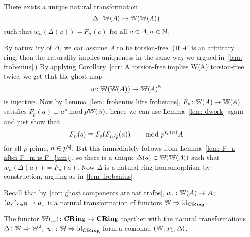 \begin{proposition} \label{prop: existence of diagonal}
    There exists a unique natural transformation
    \[
      \Delta \colon \mathbb{W}(A) \to \mathbb{W}(\mathbb{W}(A))  
    \]
    such that $w_n(\Delta(a))=F_n(a)$ for all $a \in A, n \in \mathbb{N}$.
\end{proposition}
\begin{beweis}
By naturality of $\Delta$, we can assume $A$ to be torsion-free. (If $A'$ is 
an arbitrary ring, then the naturality implies uniqueness in the same way we argued
in~\ref{lem: frobenius}.)
\todo{}
By applying Corollary~\ref{cor: A torsion-free implies W(A) torsion-free}
twice, we get that the ghost map 
\[
    w \colon \mathbb{W}(\mathbb{W}(A)) \to \mathbb{W}(A)^{\mathbb{N}}
\]
is injective. Now by Lemma~\ref{lem: frobenius lifts frobenius}, 
$F_p \colon \mathbb{W}(A) \to \mathbb{W}(A)$ satisfies $F_p(a) \equiv a^p$ mod $p\mathbb{W}(A)$,
hence we can use Lemma~\ref{lem: dwork} again and just show that
\[
  F_n(a)   \equiv F_p(F_{n/p}(a)) \text{\hskip8mm mod }p^{v_p(n)}A
\]
for all $p$ prime, $n \in p\mathbb{N}$. But this immediately follows from 
Lemma~\ref{lem: F_n after F_m is F_{nm}}, so there is a unique $\Delta(a)
\in \mathbb{W}(\mathbb{W}(A))$ such that $w_n(\Delta(a)) = F_n(a)$. Now $\Delta$ is a natural 
ring homomorphism by construction, arguing as in~\ref{lem: frobenius}.
\end{beweis}
Recall that by~\ref{cor: ghost components are nat trafos},
$w_1 \colon \mathbb{W}(A) \to A$; $(a_n)_{n \in \mathbb{N}} \mapsto a_1$
is a natural transformation of functors $\mathbb{W} \Rightarrow \operatorname{id}_{\mathbf{CRing}}$.
\begin{theorem} \label{thm: comonad structure}
    The functor $\mathbb{W}(\_) \colon \mathbf{CRing} \to \mathbf{CRing}$ together with the
    natural transformations $\Delta \colon \mathbb{W} \Rightarrow \mathbb{W}^2,$ $w_1 \colon 
    \mathbb{W} \Rightarrow \operatorname{id}_{\mathbf{CRing}}$ form a comonad $(\mathbb{W},w_1,\Delta)$.
\end{theorem}
